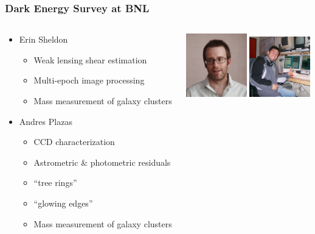 \documentclass{beamer}
\begin{document}
\frame
{
    \frametitle{Dark Energy Survey at BNL}

    \begin{columns}
        \begin{column}{0.5\textwidth}
            \begin{itemize}
                \item Erin Sheldon
                \begin{itemize}
                    \item Weak lensing shear estimation
                    \item Multi-epoch image processing
                    \item Mass measurement of galaxy clusters
                \end{itemize}
                \item Andres Plazas
                \begin{itemize}
                    \item CCD characterization
                    \item Astrometric \& photometric residuals
                    \item ``tree rings''
                    \item ``glowing edges''
                    \item Mass measurement of galaxy clusters
                \end{itemize}

            \end{itemize}
        \end{column}
        \begin{column}{0.5\textwidth}
            \includegraphics[width=100px]{me-head1-crop.jpg}
            \newline
            \includegraphics[width=100px]{plazas-penn.jpg}
        \end{column}
    \end{columns}

}
\end{document}
